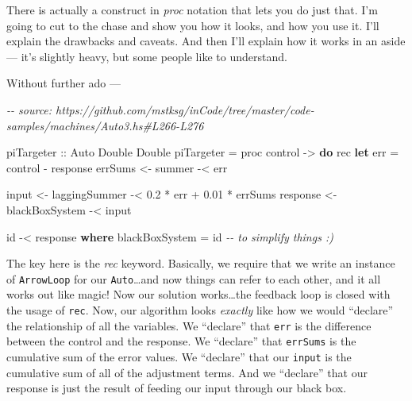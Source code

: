 \documentclass[]{article}
\newenvironment{Shaded}{}{}
\newcommand{\CommentTok}[1]{\textcolor[rgb]{0.38,0.63,0.69}{\textit{#1}}}
\newcommand{\DataTypeTok}[1]{\textcolor[rgb]{0.56,0.13,0.00}{#1}}
\newcommand{\FloatTok}[1]{\textcolor[rgb]{0.25,0.63,0.44}{#1}}
\newcommand{\FunctionTok}[1]{\textcolor[rgb]{0.02,0.16,0.49}{#1}}
\newcommand{\KeywordTok}[1]{\textcolor[rgb]{0.00,0.44,0.13}{\textbf{#1}}}
\newcommand{\NormalTok}[1]{#1}
\newcommand{\OperatorTok}[1]{\textcolor[rgb]{0.40,0.40,0.40}{#1}}
\newcommand{\OtherTok}[1]{\textcolor[rgb]{0.00,0.44,0.13}{#1}}
\begin{document}
There is actually a construct in \emph{proc} notation that lets you do just
that. I'm going to cut to the chase and show you how it looks, and how you use
it. I'll explain the drawbacks and caveats. And then I'll explain how it works
in an aside --- it's slightly heavy, but some people like to understand.

Without further ado ---

\begin{Shaded}
\begin{Highlighting}[]
\CommentTok{{-}{-} source: https://github.com/mstksg/inCode/tree/master/code{-}samples/machines/Auto3.hs\#L266{-}L276}

\OtherTok{piTargeter ::} \DataTypeTok{Auto} \DataTypeTok{Double} \DataTypeTok{Double}
\NormalTok{piTargeter }\OtherTok{=}\NormalTok{ proc control }\OtherTok{{-}\textgreater{}} \KeywordTok{do}
\NormalTok{    rec }\KeywordTok{let}\NormalTok{ err }\OtherTok{=}\NormalTok{ control }\OperatorTok{{-}}\NormalTok{ response}
\NormalTok{        errSums  }\OtherTok{\textless{}{-}}\NormalTok{ summer         }\OperatorTok{{-}\textless{}}\NormalTok{ err}

\NormalTok{        input    }\OtherTok{\textless{}{-}}\NormalTok{ laggingSummer  }\OperatorTok{{-}\textless{}} \FloatTok{0.2} \OperatorTok{*}\NormalTok{ err }\OperatorTok{+} \FloatTok{0.01} \OperatorTok{*}\NormalTok{ errSums}
\NormalTok{        response }\OtherTok{\textless{}{-}}\NormalTok{ blackBoxSystem }\OperatorTok{{-}\textless{}}\NormalTok{ input}

    \FunctionTok{id} \OperatorTok{{-}\textless{}}\NormalTok{ response}
  \KeywordTok{where}
\NormalTok{    blackBoxSystem }\OtherTok{=} \FunctionTok{id}     \CommentTok{{-}{-} to simplify things :)}
\end{Highlighting}
\end{Shaded}

The key here is the \emph{rec} keyword. Basically, we require that we write an
instance of \texttt{ArrowLoop} for our \texttt{Auto}\ldots and now things can
refer to each other, and it all works out like magic! Now our solution
works\ldots the feedback loop is closed with the usage of \texttt{rec}. Now, our
algorithm looks \emph{exactly} like how we would ``declare'' the relationship of
all the variables. We ``declare'' that \texttt{err} is the difference between
the control and the response. We ``declare'' that \texttt{errSums} is the
cumulative sum of the error values. We ``declare'' that our \texttt{input} is
the cumulative sum of all of the adjustment terms. And we ``declare'' that our
response is just the result of feeding our input through our black box.
\end{document}
